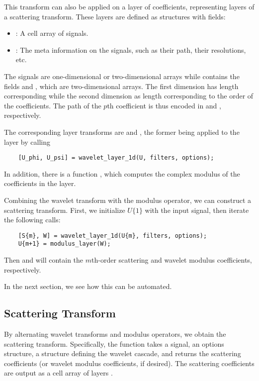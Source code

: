 \documentclass[twocolumn]{article}
\begin{document}
This transform can also be applied on a layer of coefficients, representing layers of a scattering transform. These layers are defined as structures with fields:
\begin{itemize}
	\item {}: A cell array of signals.
	\item {}: The meta information on the signals, such as their path, their resolutions, etc.
\end{itemize}
The signals are one-dimensional or two-dimensional arrays while  contains the fields  and , which are two-dimensional arrays. The first dimension has length corresponding  while the second dimension as length corresponding to the order of the coefficients. The path of the $p$th coefficient is thus encoded in  and , respectively.

The corresponding layer transforms are  and , the former being applied to the layer  by calling
\begin{lstlisting}
	[U_phi, U_psi] = wavelet_layer_1d(U, filters, options);
\end{lstlisting}

In addition, there is a function , which computes the complex modulus of the coefficients in the layer.

Combining the wavelet transform with the modulus operator, we can construct a scattering transform. First, we initialize $U\{1\}$ with the input signal, then iterate the following calls:
\begin{lstlisting}
	[S{m}, W] = wavelet_layer_1d(U{m}, filters, options);
	U{m+1} = modulus_layer(W);
\end{lstlisting}
Then  and  will contain the $m$th-order scattering and wavelet modulus coefficients, respectively.

In the next section, we see how this can be automated.

\subsection{Scattering Transform}

By alternating wavelet transforms and modulus operators, we obtain the scattering transform. Specifically, the  function takes a signal, an options structure, a structure defining the wavelet cascade, and returns the scattering coefficients (or wavelet modulus coefficients, if desired). The scattering coefficients are output as a cell array of layers .
\end{document}
